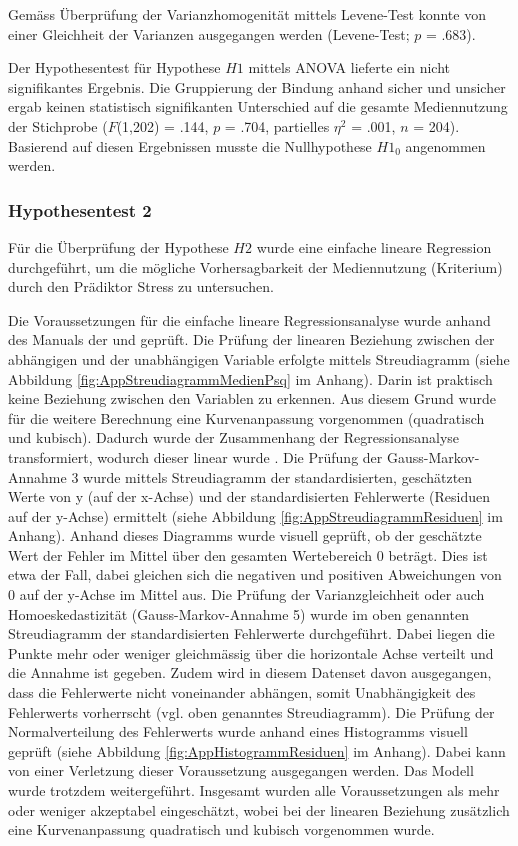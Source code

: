 Gemäss Überprüfung der Varianzhomogenität mittels Levene-Test konnte von einer Gleichheit der Varianzen ausgegangen werden (Levene-Test; $p$ = .683). 

Der Hypothesentest für Hypothese $H1$ mittels ANOVA lieferte ein nicht signifikantes Ergebnis. Die Gruppierung der Bindung anhand sicher und unsicher ergab keinen statistisch signifikanten Unterschied auf die gesamte Mediennutzung der Stichprobe ($F$(1,202) = .144, $p$ = .704, partielles $\eta^2$ = .001, $n$ = 204). Basierend auf diesen Ergebnissen musste die Nullhypothese $H1_{0}$ angenommen werden. 

\subsubsection{Hypothesentest 2}
Für die Überprüfung der Hypothese $H2$ wurde eine einfache lineare Regression durchgeführt, um die mögliche Vorhersagbarkeit der Mediennutzung (Kriterium) durch den Prädiktor Stress zu untersuchen.

Die Voraussetzungen für die einfache lineare Regressionsanalyse wurde anhand des Manuals der  und  geprüft. Die Prüfung der linearen Beziehung zwischen der abhängigen und der unabhängigen Variable erfolgte mittels Streudiagramm (siehe Abbildung \ref{fig:AppStreudiagrammMedienPsq} im Anhang). Darin ist praktisch keine Beziehung zwischen den Variablen zu erkennen. Aus diesem Grund wurde für die weitere Berechnung eine Kurvenanpassung vorgenommen (quadratisch und kubisch). Dadurch wurde der Zusammenhang der Regressionsanalyse transformiert, wodurch dieser linear wurde \cite{UniversitatZurich2018}. Die Prüfung der Gauss-Markov-Annahme 3 \cite{UniversitatZurich2018} wurde mittels Streudiagramm der standardisierten, geschätzten Werte von y (auf der x-Achse) und der standardisierten Fehlerwerte (Residuen auf der y-Achse) ermittelt (siehe  Abbildung \ref{fig:AppStreudiagrammResiduen} im Anhang). Anhand dieses Diagramms wurde visuell geprüft, ob  der geschätzte Wert der Fehler im Mittel über den gesamten Wertebereich 0 beträgt. Dies ist etwa der Fall, dabei gleichen sich die negativen und positiven Abweichungen von 0 auf der y-Achse im Mittel aus. Die Prüfung der Varianzgleichheit oder auch Homoeskedastizität (Gauss-Markov-Annahme 5) wurde im oben genannten Streudiagramm der standardisierten Fehlerwerte durchgeführt. Dabei liegen die Punkte mehr oder weniger gleichmässig über die horizontale Achse verteilt und die Annahme ist gegeben. Zudem wird in diesem Datenset davon ausgegangen, dass die Fehlerwerte nicht voneinander abhängen, somit Unabhängigkeit des Fehlerwerts vorherrscht (vgl. oben genanntes Streudiagramm). Die Prüfung der Normalverteilung des Fehlerwerts wurde anhand eines Histogramms visuell geprüft (siehe Abbildung \ref{fig:AppHistogrammResiduen} im Anhang). Dabei kann von einer Verletzung dieser Voraussetzung ausgegangen werden. Das Modell wurde trotzdem weitergeführt. Insgesamt wurden alle Voraussetzungen als mehr oder weniger akzeptabel eingeschätzt, wobei bei der linearen Beziehung zusätzlich eine Kurvenanpassung quadratisch und kubisch vorgenommen wurde.

